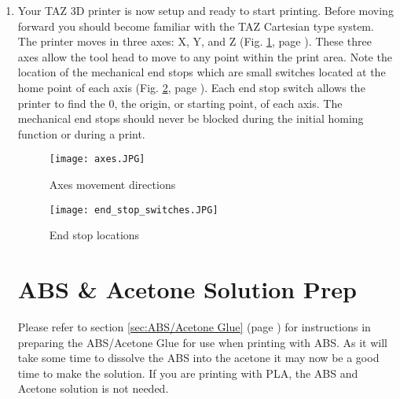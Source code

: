 \begin{enumerate}
\item Your TAZ 3D printer is now setup and ready to start printing. Before moving forward you should become familiar with the TAZ Cartesian type system. The printer moves in three axes: X, Y, and Z (Fig. \ref{fig:axes}, page \pageref{fig:axes}). These three axes allow the tool head to move to any point within the print area. Note the location of the mechanical end stops which are small switches located at the home point of each axis (Fig. \ref{fig:endstops}, page \pageref{fig:endstops}). Each end stop switch allows the printer to find the 0, the origin, or starting point, of each axis. The mechanical end stops should never be blocked during the initial homing function or during a print.
\begin{figure}[H]
\centering
\texttt{[image: axes.JPG]}
\caption{Axes movement directions}
\label{fig:axes}
\end{figure}

\begin{figure}[H]
\centering
\texttt{[image: end\_stop\_switches.JPG]}
\caption{End stop locations}
\label{fig:endstops}
\end{figure}


\section{ABS \& Acetone Solution Prep}
Please refer to section \ref{sec:ABS/Acetone Glue} (page \pageref{sec:ABS/Acetone Glue}) for instructions in preparing the ABS/Acetone Glue for use when printing with ABS. As it will take some time to dissolve the ABS into the acetone it may now be a good time to make the solution. If you are printing with PLA, the ABS and Acetone solution is not needed.

\begin{comment}
\index{driver}
\section{Installing Drivers}
Linux and Mac OSX users will not need to install a driver to communicate with the TAZ 3D printer. Windows users will. The drivers can be downloaded from \texttt{LulzBot.com/support/downloads}. A visual guide showing the driver installation process can be found in our download section as well.


\end{comment}
\end{enumerate}
